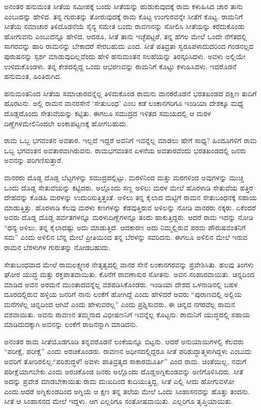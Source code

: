 ಅನಂತರ ಹನುಮಂತ ಸೀತೆಯ ಸಮೀಪಕ್ಕೆ ಬಂದು ಸೀತೆಯನ್ನು ಹುಡುಕುವುದಕ್ಕೆ ರಾಮ ಕಳುಹಿಸಿದ ಚಾರ ತಾನು ಎಂಬುದನ್ನು ಹೇಳಿದ. ತನ್ನ ಗುರುತನ್ನು ತೋರುವುದಕ್ಕೆ ರಾಮ ಕೊಟ್ಟ ಉಂಗುರವನ್ನೇ ಸೀತೆಗೆ ಕೊಟ್ಟ. ರಾಮನಿಗೆ ಸೀತೆಯ ಸಮಾಚಾರ ತಿಳಿದೊಡನೆಯೆ ಸೈನ್ಯ ಸಮೇತ ಬಂದು ರಾವಣನನ್ನು ಸೋಲಿಸಿ ಸೀತೆಯನ್ನು ಕರೆದುಕೊಂಡು ಹೋಗುವನು ಎಂಬುದನ್ನೂ ಹೇಳಿದ. ಆದರೂ, ಸೀತೆ ತಾನು ಇಚ್ಛೆಪಟ್ಟರೆ, ತನ್ನ ಹೆಗಲ ಮೇಲೆ ಒಂದೇ ನೆಗೆತದಲ್ಲಿ ಸಾಗರವನ್ನು ಹಾರಿ ರಾಮನನ್ನು ಬೇಕಾದರೆ ಸೇರಬಹುದು ಎಂದ. ಸೀತೆ ಪತಿವ್ರತಾ ಸ್ವರೂಪಳಾದುದರಿಂದ ಗಂಡನಲ್ಲದ ಪುರುಷನನ್ನು ಸ್ಪರ್ಶ ಮಾಡುವುದಿಲ್ಲವೆಂದು ಹೇಳಿ ಹನುಮಂತನ ಸಲಹೆಯನ್ನು ತಿರಸ್ಕರಿಸಿದಳು. ಅವಳು ಅಲ್ಲಿಯೇ ಉಳಿದುಕೊಂಡಳು. ತನ್ನ ಕೇಶದಲ್ಲಿದ್ದ ಒಂದು ಆಭರಣವನ್ನು ರಾಮನಿಗೆ ಕೊಟ್ಟು ಕಳುಹಿಸಿದಳು. ಇದರೊಡನೆ ಹನುಮಂತ, ಹಿಂತಿರುಗಿದ.

ಹನುಮಂತನಿಂದ ಸೀತೆಯ ಸಮಾಚಾರವನ್ನೆಲ್ಲ ತಿಳಿದುಕೊಂಡ ರಾಮನು ವಾನರರೊಡನೆ ಭರತಖಂಡದ ದಕ್ಷಿಣ ತುದಿಗೆ ಹೊರಟನು. ಅಲ್ಲಿ ರಾಮನ ವಾನರಸೇನೆ ‘ಸೇತುಬಂಧ’ ಎಂಬ ಕಡೆ ಲಂಕಾನಗರಿಗೂ ಇಂಡಿಯಾ ದೇಶಕ್ಕೂ ಮಧ್ಯೆ ದೊಡ್ಡದೊಂದು ಸೇತುವೆಯನ್ನು ಕಟ್ಟಿತು. ಈಗಲೂ ಸಮುದ್ರದ ಇಳಿತದ ಸಮಯದಲ್ಲಿ ಆ ಮರಳ ದಿಣ್ಣೆಗಳ\break ಮೇಲಿನಿಂದಲೇ ಲಂಕಾಪಟ್ಟಣಕ್ಕೆ ಹೋಗಬಹುದು.

ರಾಮ ಒಬ್ಬ ಭಗವಂತನ ಅವತಾರ. ಇಲ್ಲದೆ ಇದ್ದರೆ ಅವನಿಗೆ ಇವನ್ನೆಲ್ಲ ಮಾಡಲು ಹೇಗೆ ಸಾಧ್ಯ? ಹಿಂದೂಗಳಿಗೆ ರಾಮ ಒಬ್ಬ ಭಗವಂತನ ಅವತಾರವಾಗಿರುವನು. ರಾಮ\break ಭಗವಂತನ ಏಳನೆಯ ಅವತಾರವೆಂದು ಭರತಖಂಡದಲ್ಲಿ ಜನರು ಅವನನ್ನು ಪರಿಗಣಿಸುತ್ತಾರೆ.

ವಾನರರು ದೊಡ್ಡ ದೊಡ್ಡ ಬೆಟ್ಟಗಳನ್ನು ಸಮುದ್ರದಲ್ಲಿಟ್ಟು, ಮರಳಿನಿಂದ ಮತ್ತು ಮರಗಳಿಂದ ಅವುಗಳನ್ನು ಮುಚ್ಚಿ ಒಂದು ದೊಡ್ಡ ಸೇತುವೆಯನ್ನು ಕಟ್ಟಿದರು. ಅಲ್ಲೊಂದು ಸಣ್ಣ ಅಳಿಲು ಮರಳ ಮೇಲೆ ಹೊರಳಾಡಿ ಸೇತುವೆಯ ಹತ್ತಿರ ದೇಹವನ್ನು ಕೊಡಹಿ ಮರಳನ್ನು ಉದುರಿಸುತ್ತಿತ್ತಂತೆ. ಅಳಿಲು ತನ್ನ ಕೈಲಾದ ಮಟ್ಟಿಗೆ ರಾಮನ ಸೇತುಬಂಧನಕ್ಕೆ ಸಹಾಯ ಮಾಡುತ್ತಿತ್ತು. ಹೊರಳಾಡಿ ಕೆಲವು ಮರಳು ಕಣಗಳನ್ನು ಕೆಡವುತ್ತಿರುವ ಅಳಿಲನ್ನು ನೋಡಿ ವಾನರರು ನಕ್ಕರು. ಏಕೆಂದರೆ ಅವರು ದೊಡ್ಡ ದೊಡ್ಡ ಪರ್ವತಗಳನ್ನೂ ಮರಳುದಿಣ್ಣೆಗಳನ್ನೂ ತಂದು ಹಾಕುತ್ತಿದ್ದರು. ಆದರೆ ರಾಮ ಇದನ್ನು ನೋಡಿ “ಧನ್ಯ ಅಳಿಲು, ತನ್ನ ಕೈಲಾದಷ್ಟು ಅದು ಮಾಡುತ್ತಿದೆ. ಆದಕಾರಣ ಅದು ನಿಮ್ಮಲ್ಲಿರುವ ಪರಮ ಪೌರುಷವಂತನಿಗೆ ಸಮ” ಎಂದು ಅಳಿಲಿನ ಬೆನ್ನ ಮೇಲೆ ಪ್ರೀತಿಯಿಂದ ತನ್ನ ಬೆರಳನ್ನು ಸವರಿದನು. ಈಗಲೂ ಅಳಿಲಿನ ಮೇಲೆ ಇರುವ ರಾಮನ ಬೆರಳುಗಳ ಗುರುತನ್ನು ನೋಡಬಹುದು.

ಸೇತುಬಂಧವಾದ ಮೇಲೆ ರಾಮಲಕ್ಷ್ಮಣರ ನೇತೃತ್ವದಲ್ಲಿ ವಾನರ ಸೇನೆ ಲಂಕಾ\break ನಗರವನ್ನು ಪ್ರವೇಶಿಸಿತು. ಹಲವು ತಿಂಗಳು ಘೋರ ಯುದ್ಧ ಮತ್ತು ರಕ್ತಪಾತವಾಯಿತು. ಕೊನೆಗೆ ರಾವಣಾಸುರ ಸೋತನು. ಅವನ ಸಂಹಾರವಾಯಿತು. ಚಿನ್ನದಿಂದ ಮಾಡಿದ ಅವನ ಅರಮನೆ ಮುಂತಾದವನ್ನೆಲ್ಲ ವಶಪಡಿಸಿಕೊಂಡರು. ಇಂಡಿಯಾ ದೇಶದ ಒಳನಾಡಿನಲ್ಲಿ ಬಹಳ ದೂರದಲ್ಲಿರುವ ಹಳ್ಳಿಯ ಜನರಿಗೆ ನಾನು ಲಂಕೆಗೆ ಹೋಗಿದ್ದೆ ಎಂದು ಹೇಳಿದರೆ ಅವರು “ಪುರಾಣದಲ್ಲಿ ಅಲ್ಲಿಯ ಮನೆಗಳೆಲ್ಲ ಚಿನ್ನದಿಂದ ಆಗಿವೆ ಎಂದು ಹೇಳುವರಲ್ಲ” ಎಂದು ಪ್ರಶ್ನಿಸುವರು. ಈ ಚಿನ್ನದ ನಗರವೆಲ್ಲ ರಾಮನ ವಶವಾಯಿತು. ಅವನು ರಾವಣನ ತಮ್ಮನಾದ ವಿಭೀಷಣನಿಗೆ ಇವನ್ನೆಲ್ಲ ಕೊಟ್ಟನು. ರಾಮನಿಗೆ ಯುದ್ಧದಲ್ಲಿ ಸಹಾಯ ಮಾಡಿದುದಕ್ಕಾಗಿ ಅವನನ್ನು ಲಂಕೆಗೆ ರಾಜನನ್ನಾಗಿ ಮಾಡಿದನು.

ಅನಂತರ ರಾಮ ಸೀತೆಯೊಡಗೂಡಿ ತನ್ನವರೊಡನೆ ಲಂಕೆಯನ್ನೂ ಬಿಟ್ಟನು. ಆದರೆ ಅನುಯಾಯಿಗಳಲ್ಲಿ ಕೆಲವರು “ಪರೀಕ್ಷೆ, ಪರೀಕ್ಷೆ” ಎಂದು ಅರಚಿಕೊಂಡರು. ರಾವಣನ ಅಧೀನದಲ್ಲಿದ್ದರೂ ಸೀತೆ ಪರಿಶುದ್ಧಾತ್ಮಳಾಗಿದ್ದಳು ಎಂಬುದು ಅವರಿಗೆ ತೋರಿರಲಿಲ್ಲ.\break “ಪರಿಶುದ್ಧಳೆ! ಅವಳು ಪಾತಿವ್ರತ್ಯದ ಸಾಕಾರಮೂರ್ತಿ” ಎಂದ ರಾಮ. ಚಿಂತೆಯಿಲ್ಲ, ನಮಗೆ ಪರೀಕ್ಷೆಯಾಗಬೇಕು ಎಂದು ಅರಚಿಕೊಂಡ ಜನರು ಅಲ್ಲೊಂದು ದೊಡ್ಡ\break ಅಗ್ನಿಕುಂಡವನ್ನು ಅಣಿಗೊಳಿಸಿದರು. ಸೀತೆ ಅದನ್ನು ಪ್ರವೇಶ ಮಾಡಬೇಕಾಯಿತು.\break ರಾಮ ದುಃಖದಿಂದ ಕುದಿಯುತ್ತಿದ್ದ, ಸೀತೆ ಎಲ್ಲಿ ಸೀದು ಹೋಗುವಳೋ ಎಂದು.\break ಆದರೆ ಅಗ್ನಿಕುಂಡದಿಂದ ಅಗ್ನಿಯೆ ಆ ಕ್ಷಣ ತನ್ನ ತಲೆಯ ಮೇಲೆ ಒಂದು ಸಿಂಹಾಸನವನ್ನು ಹೊತ್ತು ತಂದನು. ಸೀತೆ ಆ ಸಿಂಹಾಸನದ ಮೇಲೆ ಇದ್ದಳು. ಆಗ ಎಲ್ಲರಿಗೂ ಸಂತೋಷವಾಯಿತು. ಎಲ್ಲರಿಗೂ ತೃಪ್ತಿಯಾಯಿತು.

